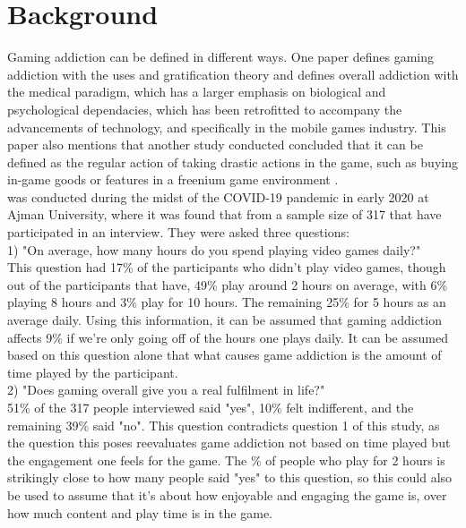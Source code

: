 \documentclass[conference]{IEEEtran}
\begin{document}
\section{Background}
Gaming addiction can be defined in different ways. One paper \cite{yasir2021} defines gaming addiction with the uses and gratification theory and defines overall addiction with the medical paradigm, which has a larger emphasis on biological and psychological dependacies, which has been retrofitted to accompany the advancements of technology, and specifically in the mobile games industry. This paper also mentions that another study conducted concluded that it can be defined as the regular action of taking drastic actions in the game, such as buying in-game goods or features in a freenium game environment \cite{XWang2021}. \\

\cite{Naaj2021} was conducted during the midst of the COVID-19 pandemic in early 2020 at Ajman University, where it was found that from a sample size of 317 that have participated in an interview. They were asked three questions: \\

1) "On average, how many hours do you spend playing video games daily?"\\
This question had 17\%  of the participants who didn't play video games, though out of the participants that have, 49\% play around 2 hours on average, with 6\%  playing 8 hours and 3\% play for 10 hours. The remaining 25\%  for 5 hours as an average daily. Using this information, it can be assumed that gaming addiction affects 9\% if we're only going off of the hours one plays daily. It can be assumed based on this question alone that what causes game addiction is the amount of time played by the participant.\\

2) "Does gaming overall give you a real fulfilment in life?"\\
51\% of the 317 people interviewed said "yes", 10\% felt indifferent, and the remaining 39\% said "no".  This question contradicts question 1 of this study, as the question this poses reevaluates game addiction not based on time played but the engagement one feels for the game. The \% of people who play for 2 hours is strikingly close to how many people said "yes" to this question, so this could also be used to assume that it's about how enjoyable and engaging the game is, over how much content and play time is in the game.\\
\end{document}
